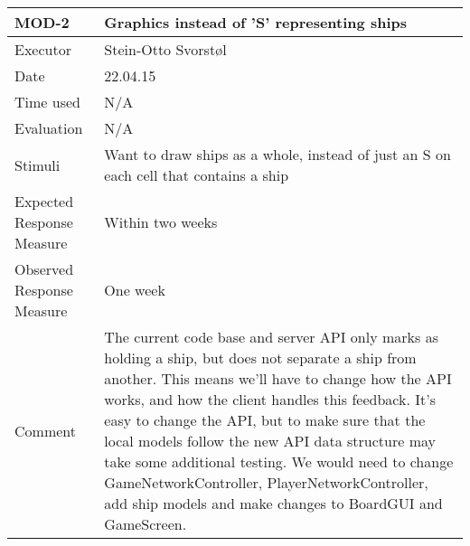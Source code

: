 \begin{table}[H]
\begin{tabular}{|l|p{10cm}|}
\hline
\textbf{MOD-2} & Graphics instead of 'S' representing ships\\ \hline
Executor    & Stein-Otto Svorstøl          \\ \hline
Date        & 22.04.15         \\ \hline
Time used   & N/A      \\ \hline
Evaluation  & N/A       \\ \hline
Stimuli     & Want to draw ships as a whole, instead of just an S on each cell that contains a ship          \\ \hline
Expected Response Measure & Within two weeks    \\ \hline
Observed Response Measure & One week    \\ \hline
Comment     &  The current code base and server API only marks as holding a ship, but does not separate a ship from another. This means we'll have to change how the API works, and how the client handles this feedback.  It's easy to change the API, but to make sure that the local models follow the new API data structure may take some additional testing. We would need to change GameNetworkController, PlayerNetworkController, add ship models and make changes to BoardGUI and GameScreen.      \\ \hline
\end{tabular}
\end{table}


